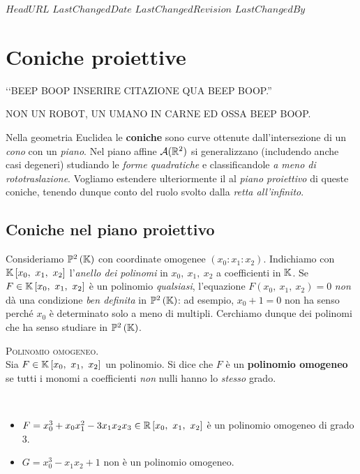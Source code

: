 \svnidlong
{$HeadURL$}
{$LastChangedDate$}
{$LastChangedRevision$}
{$LastChangedBy$}

\chapter{Coniche proiettive}

\begin{introduction}
	‘‘BEEP BOOP INSERIRE CITAZIONE QUA BEEP BOOP.''
	\begin{flushright}
		\textsc{NON UN ROBOT,} UN UMANO IN CARNE ED OSSA BEEP BOOP.
	\end{flushright}
\end{introduction}
Nella geometria Euclidea le \textbf{coniche} sono curve ottenute dall'intersezione di un \textit{cono} con un \textit{piano}. Nel piano affine $\mathcal{A}(\mathbb{R}^2)$ si generalizzano (includendo anche casi degeneri) studiando le \textit{forme quadratiche} e classificandole \textit{a meno di rototraslazione}. Vogliamo estendere ulteriormente il al \textit{piano proiettivo} di queste coniche, tenendo dunque conto del ruolo svolto dalla \textit{retta all'infinito}.
\section{Coniche nel piano proiettivo}
Consideriamo $\proj[2]{\kamp}$ con coordinate omogenee $(x_0\colon x_1\colon x_2)$. Indichiamo con $\kamp\left[x_0,\ x_1,\ x_2\right]$ l'\textit{anello dei polinomi} in $x_0,\ x_1,\ x_2$ a coefficienti in $\mathbb{K}$. Se $F\in\kamp\left[x_0,\ x_1,\ x_2\right]$ è un polinomio \textit{qualsiasi}, l'equazione $F(x_0,\ x_1,\ x_2)=0$ \textit{non} dà una condizione \textit{ben definita} in $\proj[2]{\kamp}$: ad esempio, $x_0+1=0$ non ha senso perché $x_0$ è determinato solo a meno di multipli. Cerchiamo dunque dei polinomi che ha senso studiare in $\proj[2]{\kamp}$.
\begin{define}\textsc{Polinomio omogeneo}.\\
Sia $F\in\kamp\left[x_0,\ x_1,\ x_2\right]$ un polinomio. Si dice che $F$ è un \textbf{polinomio omogeneo} se tutti i monomi a coefficienti \textit{non} nulli hanno lo \textit{stesso} grado.
\end{define}
\begin{examples}~{}
	\begin{itemize}
		\item $F=x_0^3+x_0x_1^2-3x_1x_2x_3\in\realset\left[x_0,\ x_1,\ x_2\right]$ è un polinomio omogeneo di grado $3$.
		\item $G=x_0^3-x_1x_2+1$ non è un polinomio omogeneo.
	\end{itemize}
\vspace{-3mm}
\end{examples}

